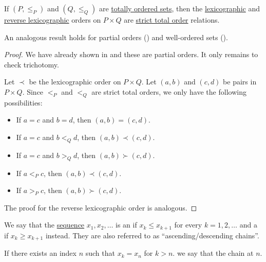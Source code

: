 \begin{proposition}\label{thm:total_lexicographic_order_is_total_order}
  If \( (P, \leq_P) \) and \( (Q, \leq_Q) \) are \hyperref[def:totally_ordered_set]{totally ordered sets}, then the \hyperref[eq:def:lexicographic_order]{lexicographic} and \hyperref[eq:def:lexicographic_order/reverse]{reverse lexicographic} orders on \( P \times Q \) are \hyperref[def:totally_ordered_set]{strict total order} relations.
\end{proposition}
\begin{comments}
  \item An analogous result holds for partial orders () and well-ordered sets ().
\end{comments}
\begin{proof}
  We have already shown in  and these are partial orders. It only remains to check trichotomy.

   Let \( \prec \) be the lexicographic order on \( P \times Q \). Let \( (a, b) \) and \( (c, d) \) be pairs in \( P \times Q \). Since \( <_P \) and \( <_Q \) are strict total orders, we only have the following possibilities:
  \begin{itemize}
    \item If \( a = c \) and \( b = d \), then \( (a, b) = (c, d) \).
    \item If \( a = c \) and \( b <_Q d \), then \( (a, b) \prec (c, d) \).
    \item If \( a = c \) and \( b >_Q d \), then \( (a, b) \succ (c, d) \).
    \item If \( a <_P c \), then \( (a, b) \prec (c, d) \).
    \item If \( a >_P c \), then \( (a, b) \succ (c, d) \).
  \end{itemize}

  The proof for the reverse lexicographic order is analogous.
\end{proof}

\begin{definition}\label{def:stabilizing_chain}\mimprovised
  We say that the \hyperref[def:sequence]{sequence} \( x_1, x_2, \ldots \) is an  if \( x_k \leq x_{k+1} \) for every \( k = 1, 2, \ldots \) and a  if \( x_k \geq x_{k+1} \) instead. They are also referred to as \enquote{ascending/descending chains}.

  If there exists an index \( n \) such that \( x_k = x_n \) for \( k > n \). we say that the chain  at \( n \).
\end{definition}

